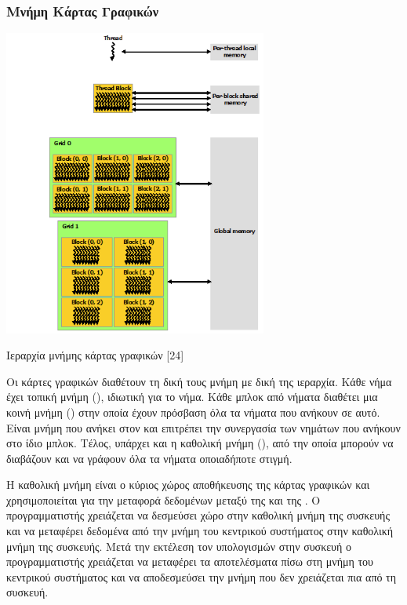 \subsubsection{Μνήμη Κάρτας Γραφικών}
 
\begin{Illustration}[!h] 
	\centering
	\includegraphics[width=0.65\textwidth]{images/image051.png} 
	\caption{Ιεραρχία μνήμης κάρτας γραφικών  [24]}
	\label{image-3.8}
\end{Illustration}

Οι κάρτες γραφικών διαθέτουν τη δική τους μνήμη με δική της ιεραρχία. Κάθε νήμα έχει τοπική μνήμη (), ιδιωτική για το νήμα. Κάθε μπλοκ από νήματα διαθέτει μια κοινή μνήμη () στην οποία έχουν πρόσβαση όλα τα νήματα που ανήκουν σε αυτό. Είναι μνήμη που ανήκει στον  και επιτρέπει την συνεργασία των νημάτων που ανήκουν στο ίδιο μπλοκ. Τέλος, υπάρχει και η καθολική μνήμη (), από την οποία μπορούν να διαβάζουν και να γράφουν όλα τα νήματα οποιαδήποτε στιγμή. 

Η καθολική μνήμη είναι ο κύριος χώρος αποθήκευσης της κάρτας γραφικών και χρησιμοποιείται για την μεταφορά δεδομένων μεταξύ της  και της . Ο προγραμματιστής χρειάζεται να δεσμεύσει χώρο στην καθολική μνήμη της συσκευής και να μεταφέρει δεδομένα από την μνήμη του κεντρικού συστήματος στην καθολική μνήμη της συσκευής. Μετά την εκτέλεση τον υπολογισμών στην συσκευή ο προγραμματιστής χρειάζεται να μεταφέρει τα αποτελέσματα πίσω στη μνήμη του κεντρικού συστήματος και να αποδεσμεύσει την μνήμη που δεν χρειάζεται πια από τη συσκευή. 

